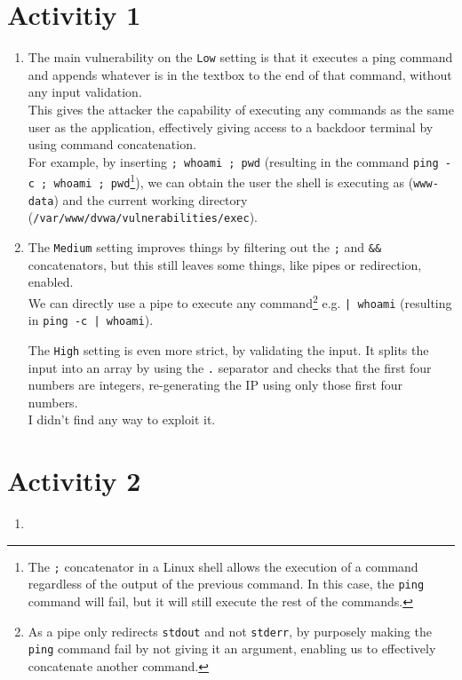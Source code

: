 \section*{Activitiy 1}

\begin{enumerate}

    \item The main vulnerability on the \texttt{Low} setting is that it executes a ping command and appends whatever is in the textbox to the end of that command, without any input validation.\\
    This gives the attacker the capability of executing any commands as the same user as the application, effectively giving access to a backdoor terminal by using command concatenation.\\
    For example, by inserting \texttt{; whoami ; pwd} (resulting in the command \texttt{ping -c ; whoami ; pwd}\footnote{The \texttt{;} concatenator in a Linux shell allows the execution of a command regardless of the output of the previous command. In this case, the \texttt{ping} command will fail, but it will still execute the rest of the commands.}), we can obtain the user the shell is executing as (\texttt{www-data}) and the current working directory (\texttt{/var/www/dvwa/vulnerabilities/exec}).
    \item The \texttt{Medium} setting improves things by filtering out the \texttt{;} and \texttt{\&\&} concatenators, but this still leaves some things, like pipes or redirection, enabled.\\
    We can directly use a pipe to execute any command\footnote{As a pipe only redirects \texttt{stdout} and not \texttt{stderr}, by purposely making the \texttt{ping} command fail by not giving it an argument, enabling us to effectively concatenate another command.} e.g. \texttt{| whoami} (resulting in \texttt{ping -c | whoami}).\newline
    
    The \texttt{High} setting is even more strict, by validating the input. It splits the input into an array by using the \texttt{.} separator and checks that the first four numbers are integers, re-generating the IP using only those first four numbers.\\
    I didn't find any way to exploit it.
    
\end{enumerate}


\section*{Activitiy 2}

\begin{enumerate}
    \item 
\end{enumerate}
